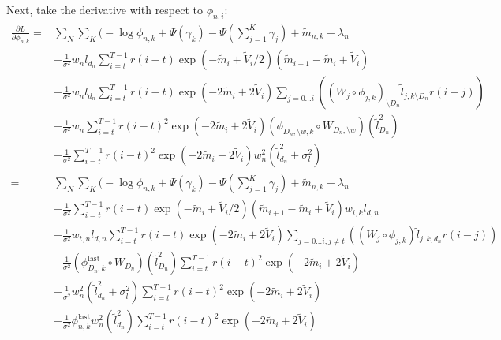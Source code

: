 \documentclass{article}
\newcommand{\mv}{\tilde{m}}
\newcommand{\vv}[0]{\tilde{V}}
\newcommand{\lv}{\tilde{l}}
\newcommand{\partl}[2]{\frac{\partial #1}{\partial #2}}
\begin{document}
Next, take the derivative with respect to $\phi_{n,i}$:
\begin{align}
  \label{eq:phi_term}
  \partl{L}{\phi_{n,k}}
 = & \sum_N \sum_K \Bigg( -\log{\phi_{n,k}} + \Psi(\gamma_k) - \Psi(\sum_{j=1}^K \gamma_j) + \mv_{n,k} + \lambda_n \\
&  + \frac{1}{\sigma^2} w_{n} l_{d_n} \sum_{i=t}^{T-1} r(i-t) \exp(-\mv_i + \vv_i / 2) (\mv_{i + 1} - \mv_i + \vv_i) \\
&  - \frac{1}{\sigma^2} w_{n} l_{d_n} \sum_{i=t}^{T-1} r(i-t) \exp(-2\mv_i + 2 \vv_i) \sum_{j=0\ldots i} \left( {({W_j} \circ {\phi_{j,k}})}_{\setminus D_n} \lv_{j,k\setminus D_n} r(i-j) \right) \\
&  - \frac{1}{\sigma^2} w_{n} \sum_{i=t}^{T-1} r(i-t)^2 \exp(-2\mv_i + 2 \vv_i) (\phi_{D_n, \setminus w,k} \circ W_{D_n, \setminus w}) ({\lv}_{D_n}^2) \\
&  - \frac{1} {\sigma^2} \sum_{i=t}^{T-1} r(i-t)^2 \exp(-2\mv_i + 2 \vv_i) w_{n}^2 ({\lv}_{d_n}^2 + \sigma_l^2) \\
 = & \sum_N \sum_K \Bigg( -\log{\phi_{n,k}} + \Psi(\gamma_k) - \Psi(\sum_{j=1}^K \gamma_j) + \mv_{n,k} + \lambda_n \\
&  + \frac{1}{\sigma^2} \sum_{i=t}^{T-1} r(i-t) \exp(-\mv_i + \vv_i / 2) (\mv_{i + 1} - \mv_i + \vv_i) w_{i,k} l_{d,n} \\
&  - \frac{1} {\sigma^2} w_{t,n} l_{d,n} \sum_{i=t}^{T-1} r(i-t) \exp(-2\mv_i + 2 \vv_i) \sum_{j=0\ldots i, j \neq t} \left( (W_{j} \circ \phi_{j,k}) \lv_{j,k,d_n} r(i-j) \right) \\
&  - \frac{1} {\sigma^2} (\phi_{D_n,k}^{\mbox{last}} \circ W_{D_n}) (\lv_{D_n}^2) \sum_{i=t}^{T-1} r(i-t)^2 \exp(-2\mv_i + 2 \vv_i) \\
&  - \frac{1} {\sigma^2} w_{n}^2 (\lv_{d_n}^2 + \sigma_l^2) \sum_{i=t}^{T-1} r(i-t)^2 \exp(-2\mv_i + 2 \vv_i) \\
&  + \frac{1} {\sigma^2} \phi_{n,k}^{\mbox{last}} w_{n}^2 (\lv_{d_n}^2) \sum_{i=t}^{T-1} r(i-t)^2 \exp(-2\mv_i + 2 \vv_i) \\
\end{align}
\end{document}
